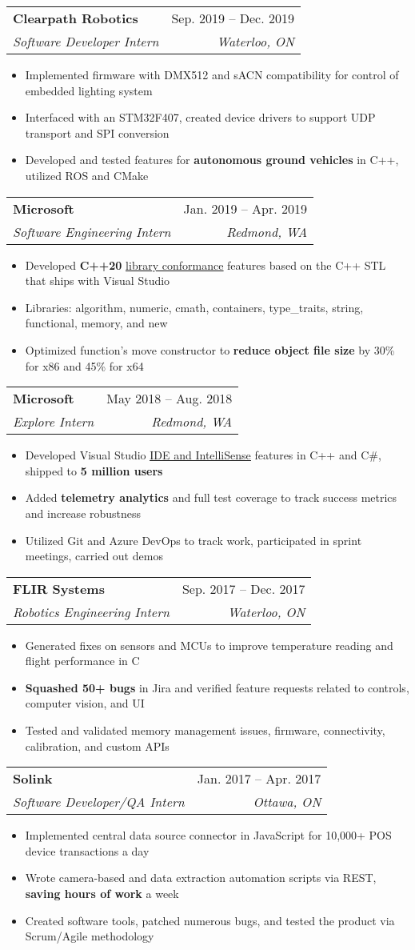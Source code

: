 \documentclass[letterpaper,11pt]{article}
\makeatletter
\newcommand{\resumeItem}[1]{
  \item\small{
    {#1 \vspace{-2pt}}
  }
}
\newcommand{\resumeSubheading}[4]{
  \vspace{-2pt}\item
    \begin{tabular*}{0.97\textwidth}[t]{l@{\extracolsep{\fill}}r}
      \textbf{#1} & #2 \\
      \textit{\small#3} & \textit{\small #4} \\
    \end{tabular*}\vspace{-7pt}
}
\newcommand{\resumeItemListStart}{\begin{itemize}}
\newcommand{\resumeItemListEnd}{\end{itemize}\vspace{-5pt}}
\makeatother
\begin{document}
    \resumeSubheading
      {Clearpath Robotics}{Sep. 2019 -- Dec. 2019}
      {Software Developer Intern}{Waterloo, ON}
      \resumeItemListStart
        \resumeItem{Implemented firmware with DMX512 and sACN compatibility for control of embedded lighting system}
        \resumeItem{Interfaced with an STM32F407, created device drivers to support UDP transport and SPI conversion}
        \resumeItem{Developed and tested features for \textbf{autonomous ground vehicles} in C++, utilized ROS and CMake}
      \resumeItemListEnd

    \resumeSubheading
      {Microsoft}{Jan. 2019 -- Apr. 2019}
      {Software Engineering Intern}{Redmond, WA}
      \resumeItemListStart
        \resumeItem{Developed \textbf{C++20} 
          \href{https://devblogs.microsoft.com/cppblog/c20-features-and-fixes-in-vs-2019-16-1-through-16-6}
          {\underline{library conformance}} 
          features based on the C++ STL that ships with Visual Studio}
        \resumeItem{Libraries: algorithm, numeric, cmath, containers, type\_traits, string, functional, memory, and new}
        \resumeItem{Optimized function's move constructor to \textbf{reduce object file size} by 30\% for x86 and 45\% for x64}
      \resumeItemListEnd

    \resumeSubheading
      {Microsoft}{May 2018 -- Aug. 2018}
      {Explore Intern}{Redmond, WA}
      \resumeItemListStart
        \resumeItem{Developed Visual Studio 
          \href{https://devblogs.microsoft.com/cppblog/c-productivity-improvements-in-visual-studio-2019-preview-2}
          {\underline{IDE and IntelliSense}} 
          features in C++ and C\#, shipped to \textbf{5 million users}}
        \resumeItem{Added \textbf{telemetry analytics} and full test coverage to track success metrics and increase robustness}
        \resumeItem{Utilized Git and Azure DevOps to track work, participated in sprint meetings, carried out demos}
      \resumeItemListEnd

    \resumeSubheading
      {FLIR Systems}{Sep. 2017 -- Dec. 2017}
      {Robotics Engineering Intern}{Waterloo, ON}
      \resumeItemListStart
        \resumeItem{Generated fixes on sensors and MCUs to improve temperature reading and flight performance in C}
        \resumeItem{\textbf{Squashed 50+ bugs} in Jira and verified feature requests related to controls, computer vision, and UI}
        \resumeItem{Tested and validated memory management issues, firmware, connectivity, calibration, and custom APIs}
      \resumeItemListEnd

    \resumeSubheading
      {Solink}{Jan. 2017 -- Apr. 2017}
      {Software Developer/QA Intern}{Ottawa, ON}
      \resumeItemListStart
        \resumeItem{Implemented central data source connector in JavaScript for 10,000+ POS device transactions a day}
        \resumeItem{Wrote camera-based and data extraction automation scripts via REST, \textbf{saving hours of work} a week}
        \resumeItem{Created software tools, patched numerous bugs, and tested the product via Scrum/Agile methodology}
      \resumeItemListEnd
\end{document}
